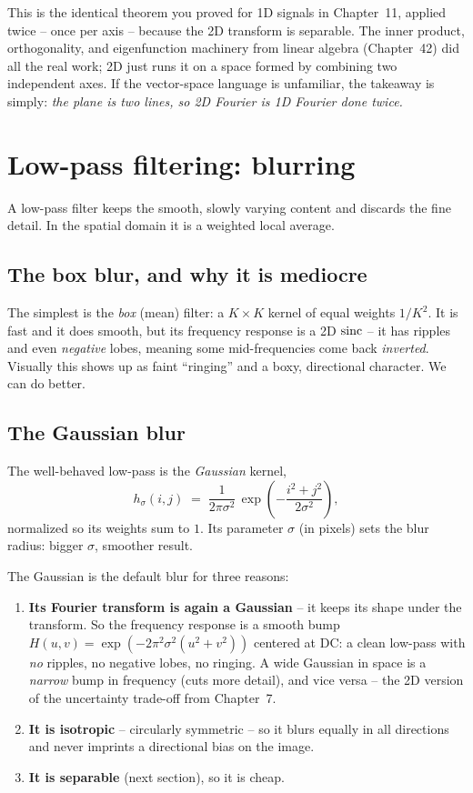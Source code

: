 \begin{connectionbox}
This is the identical theorem you proved for 1D signals in
Chapter~11, applied twice -- once per axis -- because the 2D transform is separable.
The inner product, orthogonality, and eigenfunction machinery from linear
algebra (Chapter~42) did all the real work; 2D just runs it on a space formed by combining two independent axes. If the
vector-space language is unfamiliar, the takeaway is simply: \emph{the plane is
two lines, so 2D Fourier is 1D Fourier done twice.}
\end{connectionbox}

\section{Low-pass filtering: blurring}
\label{ch31:lowpass}

A low-pass filter keeps the smooth, slowly varying content and discards the fine
detail. In the spatial domain it is a weighted local average.

\subsection{The box blur, and why it is mediocre}
The simplest is the \emph{box} (mean) filter: a $K\times K$ kernel of equal weights
$1/K^2$. It is fast and it does smooth, but its frequency response is a 2D
$\operatorname{sinc}$ -- it has ripples and even \emph{negative} lobes, meaning some
mid-frequencies come back \emph{inverted}. Visually this shows up as faint
``ringing'' and a boxy, directional character. We can do better.

\subsection{The Gaussian blur}
The well-behaved low-pass is the \emph{Gaussian} kernel,
\begin{equation}
h_\sigma(i,j) \;=\; \frac{1}{2\pi\sigma^2}\,
\exp\!\left(-\frac{i^2+j^2}{2\sigma^2}\right),
\label{ch31:gauss2d}
\end{equation}
normalized so its weights sum to $1$. Its parameter $\sigma$ (in pixels) sets the
blur radius: bigger $\sigma$, smoother result.

The Gaussian is the default blur for three reasons:

\begin{enumerate}
\item \textbf{Its Fourier transform is again a Gaussian} -- it keeps its shape under
the transform. So the frequency response is a smooth bump
$H(u,v) = \exp(-2\pi^2\sigma^2(u^2+v^2))$ centered at DC: a clean low-pass with
\emph{no} ripples, no negative lobes, no ringing. A wide Gaussian in space is a
\emph{narrow} bump in frequency (cuts more detail), and vice versa -- the 2D version
of the uncertainty trade-off from Chapter~7.
\item \textbf{It is isotropic} -- circularly symmetric -- so it blurs equally in all
directions and never imprints a directional bias on the image.
\item \textbf{It is separable} (next section), so it is cheap.
\end{enumerate}


